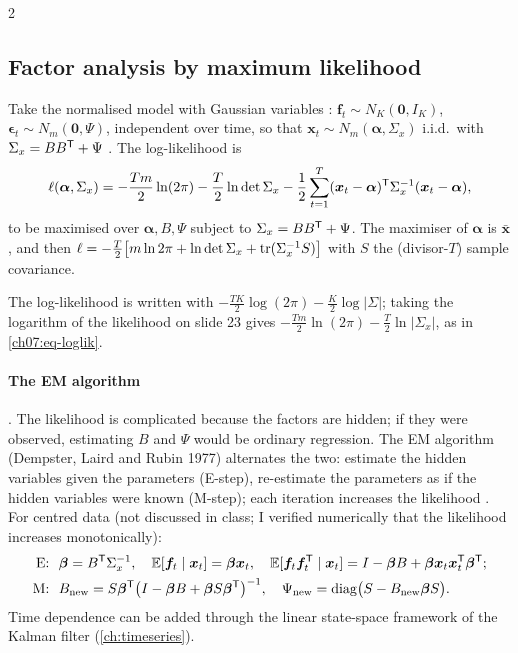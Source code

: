 \begin{paracol}{2}
\subsection{Factor analysis by maximum likelihood}\label{ch07:sec-fa}
Take the normalised model with Gaussian variables :
$\bm f_t\sim N_K(\bm0,I_K)$, $\bm\epsilon_t\sim N_m(\bm0,\Psi)$, independent over time, so that
$\bm x_t\sim N_m(\bm\alpha,\Sigma_x)$ i.i.d.\ with $\Sigma_x=BB^{\mathsf T}+\Psi$ . The log-likelihood is
\begin{equation}\label{ch07:eq-loglik}
  \ell(\bm\alpha,\Sigma_x)=-\frac{Tm}{2}\ln(2\pi)-\frac T2\ln\det\Sigma_x-\frac12\sum_{t=1}^T(\bm x_t-\bm\alpha)^{\mathsf T}\Sigma_x^{-1}(\bm x_t-\bm\alpha),
\end{equation}
to be maximised over $\bm\alpha,B,\Psi$ subject to $\Sigma_x=BB^{\mathsf T}+\Psi$. The maximiser of $\bm\alpha$ is $\bar{\bm x}$, and then
$\ell=-\frac T2\bigl[m\ln2\pi+\ln\det\Sigma_x+\operatorname{tr}(\Sigma_x^{-1}S)\bigr]$ with $S$ the (divisor-$T$) sample covariance.

\begin{coursenote}
The log-likelihood is written with $-\frac{TK}{2}\log(2\pi)-\frac K2\log|\Sigma|$; taking the logarithm of the likelihood on
slide 23 gives $-\frac{Tm}{2}\ln(2\pi)-\frac T2\ln|\Sigma_x|$, as in \eqref{ch07:eq-loglik}.
\end{coursenote}

\paragraph{The EM algorithm} . The likelihood is complicated because the factors are hidden;
if they were observed, estimating $B$ and $\Psi$ would be ordinary regression. The EM algorithm (Dempster, Laird
and Rubin 1977) alternates the two: estimate the hidden variables given the parameters (E-step), re-estimate the
parameters as if the hidden variables were known (M-step); each iteration increases the likelihood
. For centred data (not discussed in class; I verified numerically that the likelihood increases
monotonically):
\begin{align*}
  \text{E: }\ & \bm\beta=B^{\mathsf T}\Sigma_x^{-1},\quad \mathbb{E}[\bm f_t\mid\bm x_t]=\bm\beta\bm x_t,\quad
     \mathbb{E}[\bm f_t\bm f_t^{\mathsf T}\mid\bm x_t]=I-\bm\beta B+\bm\beta\bm x_t\bm x_t^{\mathsf T}\bm\beta^{\mathsf T};\\
  \text{M: }\ & B_{\rm new}=S\bm\beta^{\mathsf T}\bigl(I-\bm\beta B+\bm\beta S\bm\beta^{\mathsf T}\bigr)^{-1},\quad
     \Psi_{\rm new}=\operatorname{diag}\bigl(S-B_{\rm new}\bm\beta S\bigr).
\end{align*}
Time dependence can be added through the linear state-space framework of the Kalman filter
(\cref{ch:timeseries}).


\end{paracol}
